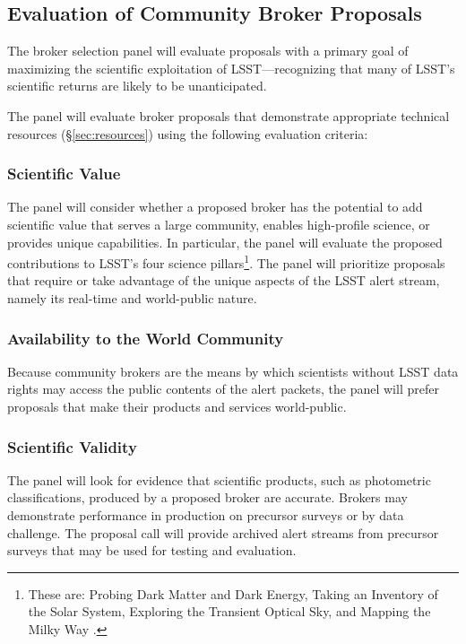 \subsection{Evaluation of Community Broker Proposals} \label{sec:evaluation}

The broker selection panel will evaluate proposals with a primary goal of maximizing the scientific exploitation of LSST---recognizing that many of LSST's scientific returns are likely to be unanticipated.

The panel will evaluate broker proposals that demonstrate appropriate technical resources (\S \ref{sec:resources}) using the following evaluation criteria:

\subsubsection{Scientific Value}

The panel will consider whether a proposed broker has the potential to add scientific value that serves a large community, enables high-profile science, or provides unique capabilities.
In particular, the panel will evaluate the proposed contributions to LSST's four science pillars\footnote{These are: Probing Dark Matter and Dark Energy, Taking an Inventory of the Solar System, Exploring the Transient Optical Sky, and Mapping the Milky Way .}.
The panel will prioritize proposals that require or take advantage of the unique aspects of the LSST alert stream, namely its real-time and world-public nature.

\subsubsection{Availability to the World Community}

Because community brokers are the means by which scientists without LSST data rights may access the public contents of the alert packets, the panel will prefer proposals that make their products and services world-public.

\subsubsection{Scientific Validity}

The panel will look for evidence that scientific products, such as photometric classifications, produced by a proposed broker are accurate.  
Brokers may demonstrate performance in production on precursor surveys or by data challenge.
The proposal call will provide archived alert streams from precursor surveys that may be used for testing and evaluation.


